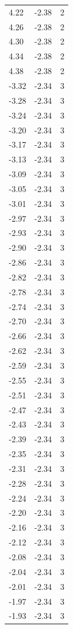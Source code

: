 \begin{longtable}{lrr}
  4.22 & -2.38 & 2 \\
  4.26 & -2.38 & 2 \\
  4.30 & -2.38 & 2 \\
  4.34 & -2.38 & 2 \\
  4.38 & -2.38 & 2 \\
  -3.32 & -2.34 & 3 \\
  -3.28 & -2.34 & 3 \\
  -3.24 & -2.34 & 3 \\
  -3.20 & -2.34 & 3 \\
  -3.17 & -2.34 & 3 \\
  -3.13 & -2.34 & 3 \\
  -3.09 & -2.34 & 3 \\
  -3.05 & -2.34 & 3 \\
  -3.01 & -2.34 & 3 \\
  -2.97 & -2.34 & 3 \\
  -2.93 & -2.34 & 3 \\
  -2.90 & -2.34 & 3 \\
  -2.86 & -2.34 & 3 \\
  -2.82 & -2.34 & 3 \\
  -2.78 & -2.34 & 3 \\
  -2.74 & -2.34 & 3 \\
  -2.70 & -2.34 & 3 \\
  -2.66 & -2.34 & 3 \\
  -2.62 & -2.34 & 3 \\
  -2.59 & -2.34 & 3 \\
  -2.55 & -2.34 & 3 \\
  -2.51 & -2.34 & 3 \\
  -2.47 & -2.34 & 3 \\
  -2.43 & -2.34 & 3 \\
  -2.39 & -2.34 & 3 \\
  -2.35 & -2.34 & 3 \\
  -2.31 & -2.34 & 3 \\
  -2.28 & -2.34 & 3 \\
  -2.24 & -2.34 & 3 \\
  -2.20 & -2.34 & 3 \\
  -2.16 & -2.34 & 3 \\
  -2.12 & -2.34 & 3 \\
  -2.08 & -2.34 & 3 \\
  -2.04 & -2.34 & 3 \\
  -2.01 & -2.34 & 3 \\
  -1.97 & -2.34 & 3 \\
  -1.93 & -2.34 & 3 \\

\end{longtable}
